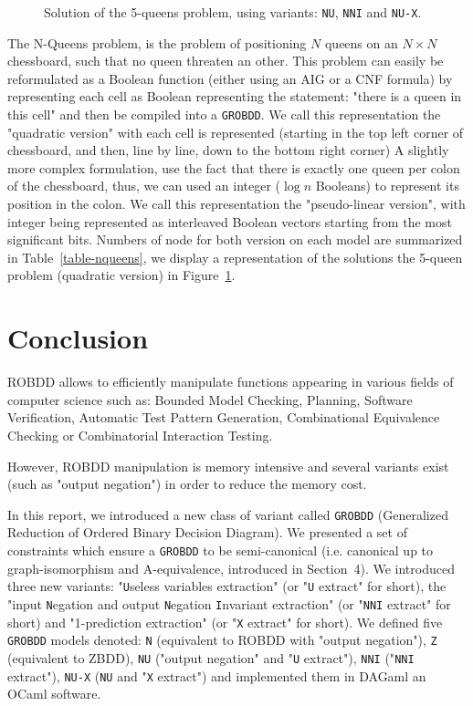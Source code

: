 \documentclass[a4paper,10pt]{article}
\newcommand{\includeframe}[4]{\makebox[#2\linewidth]{\texttt{[image: \#4]}}}
\newcommand{\Uextract}{"\texttt{U}seless variables extraction"}
\newcommand{\uextract}{"\texttt{U} extract"}
\newcommand{\NNIextract}{"input \texttt{N}egation and output \texttt{N}egation \texttt{I}nvariant extraction"}
\newcommand{\nniextract}{"\texttt{NNI} extract"}
\newcommand{\Xextract}{"1-prediction extraction"}
\newcommand{\xextract}{"\texttt{X} extract"}
\newcommand{\GroBdd}{\texttt{GROBDD}}
\begin{document}
\begin{figure}
\center
\includeframe{1}{0.9}{}{nqueens.pdf}
\caption{Solution of the 5-queens problem, using variants: \texttt{NU}, \texttt{NNI} and \texttt{NU-X}.}
\label{figure-nqueens}
\end{figure}

The N-Queens problem, is the problem of positioning $N$ queens on an $N\times N$ chessboard, such that no queen threaten an other.
This problem can easily be reformulated as a Boolean function (either using an AIG or a CNF formula) by representing each cell as Boolean representing the statement: "there is a queen in this cell" and then be compiled into a \GroBdd{}.
We call this representation the "quadratic version" with each cell is represented (starting in the top left corner of chessboard, and then, line by line, down to the bottom right corner)
A slightly more complex formulation, use the fact that there is exactly one queen per colon of the chessboard, thus, we can used an integer ($\log n$ Booleans) to represent its position in the colon.
We call this representation the "pseudo-linear version", with integer being represented as interleaved Boolean vectors starting from the most significant bits.
Numbers of node for both version on each model are summarized in Table~\ref{table-nqueens}, we display a representation of the solutions the 5-queen problem (quadratic version) in Figure~\ref{figure-nqueens}.



\section{Conclusion}

ROBDD allows to efficiently manipulate functions appearing in various fields of computer science such as: Bounded Model Checking, Planning, Software Verification, Automatic Test Pattern Generation, Combinational Equivalence Checking or Combinatorial Interaction Testing.

However, ROBDD manipulation is memory intensive and several variants exist (such as "output negation") in order to reduce the memory cost.

In this report, we introduced a new class of variant called \GroBdd{} (Generalized Reduction of Ordered Binary Decision Diagram).
We presented a set of constraints which ensure a \GroBdd{} to be semi-canonical (i.e. canonical up to graph-isomorphism and A-equivalence, introduced in Section~4).
We introduced three new variants: \Uextract{} (or \uextract{} for short), the \NNIextract{} (or \nniextract{} for short) and \Xextract{} (or \xextract{} for short).
We defined five \GroBdd{} models denoted: \texttt{N} (equivalent to ROBDD with "output negation"), \texttt{Z} (equivalent to ZBDD), \texttt{NU} ("output negation" and \uextract{}), \texttt{NNI} (\nniextract{}), \texttt{NU-X} (\texttt{NU} and \xextract{}) and implemented them in DAGaml\cite{DAGamlGitHub} an OCaml software.
\end{document}
